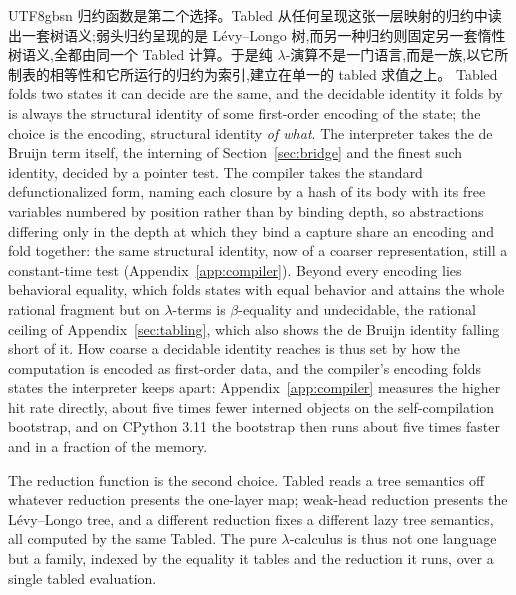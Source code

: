 \begin{CJK*}{UTF8}{gbsn}
  归约函数是第二个选择。\textsf{Tabled} 从任何呈现这张一层映射的归约中读出一套树语义;弱头归约呈现的是 Lévy--Longo 树,而另一种归约则固定另一套惰性树语义,全都由同一个 \textsf{Tabled} 计算。于是纯 $\lambda$-演算不是一门语言,而是一族,以它所制表的相等性和它所运行的归约为索引,建立在单一的 tabled 求值之上。
  \else
  \textsf{Tabled} folds two states it can decide are the same, and the decidable identity it folds by is always the structural identity of some first-order encoding of the state; the choice is the encoding, structural identity \emph{of what}. The interpreter takes the de Bruijn term itself, the interning of Section~\ref{sec:bridge} and the finest such identity, decided by a pointer test. The compiler takes the standard defunctionalized form, naming each closure by a hash of its body with its free variables numbered by position rather than by binding depth, so abstractions differing only in the depth at which they bind a capture share an encoding and fold together: the same structural identity, now of a coarser representation, still a constant-time test (Appendix~\ref{app:compiler}). Beyond every encoding lies behavioral equality, which folds states with equal behavior and attains the whole rational fragment but on $\lambda$-terms is $\beta$-equality and undecidable, the rational ceiling of Appendix~\ref{sec:tabling}, which also shows the de Bruijn identity falling short of it. How coarse a decidable identity reaches is thus set by how the computation is encoded as first-order data, and the compiler's encoding folds states the interpreter keeps apart: Appendix~\ref{app:compiler} measures the higher hit rate directly, about five times fewer interned objects on the self-compilation bootstrap, and on CPython 3.11 the bootstrap then runs about five times faster and in a fraction of the memory.

  The reduction function is the second choice. \textsf{Tabled} reads a tree semantics off whatever reduction presents the one-layer map; weak-head reduction presents the L\'evy--Longo tree, and a different reduction fixes a different lazy tree semantics, all computed by the same \textsf{Tabled}. The pure $\lambda$-calculus is thus not one language but a family, indexed by the equality it tables and the reduction it runs, over a single tabled evaluation.
  \fi

  \section{}\label{sec:related}


\end{CJK*}
